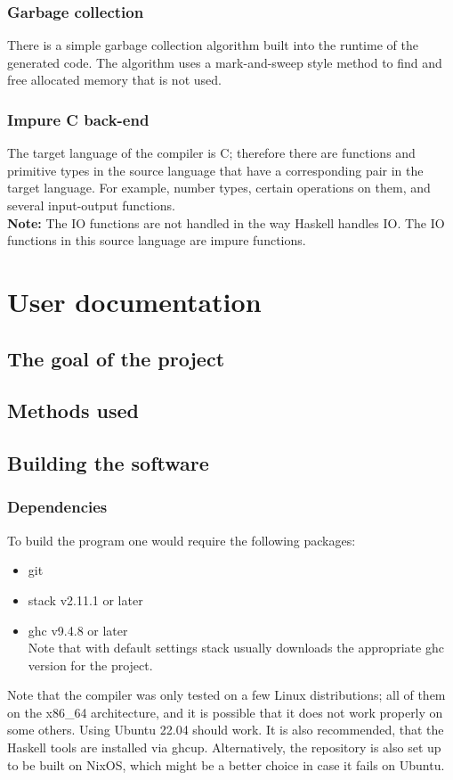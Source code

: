 \documentclass[12pt]{article}
\begin{document}
\subsubsection{Garbage collection} %

There is a simple garbage collection algorithm built into the runtime of the
generated code. The algorithm uses a mark-and-sweep style method to find and
free allocated memory that is not used.

\subsubsection{Impure C back-end} %

The target language of the compiler is C; therefore there are functions and
primitive types in the source language that have a corresponding pair in the
target language. For example, number types, certain operations on them, and
several input-output functions. \\ \textbf{Note:} The IO functions are not handled in
the way Haskell handles IO. The IO functions in this source language are impure
functions.

\pagebreak
\section{User documentation}

\subsection{The goal of the project} %
\subsection{Methods used} %

\subsection{Building the software}
\subsubsection{Dependencies}

To build the program one would require the following packages:
\begin{itemize}
    \item git
    \item stack v2.11.1 or later
    \item ghc v9.4.8 or later \\ Note that with default settings stack usually
        downloads the appropriate ghc version for the project.
\end{itemize}
Note that the compiler was only tested on a few Linux distributions; all of them
on the x86\_64 architecture, and it is possible that it does not work properly
on some others. Using Ubuntu 22.04 should work. It is also recommended, that the
Haskell tools are installed via ghcup. Alternatively, the repository is also set
up to be built on NixOS, which might be a better choice in case it fails on
Ubuntu.
\end{document}
